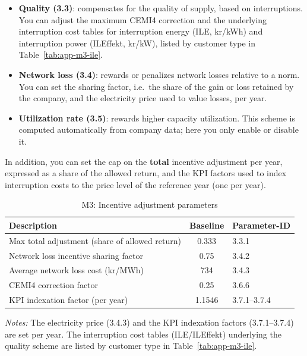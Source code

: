 \begin{itemize}
  \item \textbf{Quality (3.3)}: compensates for the quality of supply, based on interruptions. You can adjust the maximum CEMI4 correction and the underlying interruption cost tables for interruption energy (ILE, kr/kWh) and interruption power (ILEffekt, kr/kW), listed by customer type in Table~\ref{tab:app-m3-ile}.
  \item \textbf{Network loss (3.4)}: rewards or penalizes network losses relative to a norm. You can set the sharing factor, i.e.\ the share of the gain or loss retained by the company, and the electricity price used to value losses, per year.
  \item \textbf{Utilization rate (3.5)}: rewards higher capacity utilization. This scheme is computed automatically from company data; here you only enable or disable it.
\end{itemize}

\noindent In addition, you can set the cap on the \textbf{total} incentive adjustment per year, expressed as a share of the allowed return, and the KPI factors used to index interruption costs to the price level of the reference year (one per year).

\begin{table}[H]
\centering
\begin{singlespace}
\footnotesize
\begin{threeparttable}
\caption{M3: Incentive adjustment parameters}
\label{tab:app-m3-inc}
\begin{tabular}{@{}p{9cm}cl@{}}
\toprule
\textbf{Description} & \textbf{Baseline} & \textbf{Parameter-ID} \\
\midrule
Max total adjustment (share of allowed return) & 0.333 & 3.3.1 \\
Network loss incentive sharing factor & 0.75 & 3.4.2 \\
Average network loss cost (kr/MWh) & 734 & 3.4.3 \\
CEMI4 correction factor & 0.25 & 3.6.6 \\
KPI indexation factor (per year) & 1.1546 & 3.7.1--3.7.4 \\
\bottomrule
\end{tabular}
\begin{tablenotes}
\item \textit{Notes:} The electricity price (3.4.3) and the KPI indexation factors (3.7.1--3.7.4) are set per year. The interruption cost tables (ILE/ILEffekt) underlying the quality scheme are listed by customer type in Table~\ref{tab:app-m3-ile}.
\end{tablenotes}
\end{threeparttable}
\end{singlespace}
\end{table}

